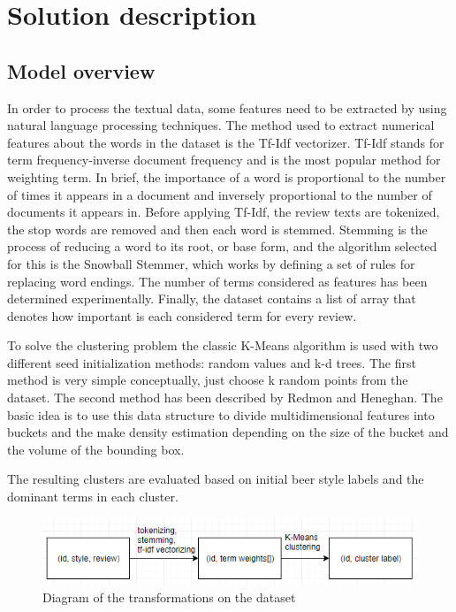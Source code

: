 \documentclass[12pt]{article}
\begin{document}
	\section{Solution description}
	\subsection{Model overview}
	In order to process the textual data, some features need to be extracted by using natural language processing techniques. The method used to extract numerical features about the words in the dataset is the Tf-Idf vectorizer. Tf-Idf\cite{TfIdfBook} stands for term frequency-inverse document frequency and is the most popular method for weighting term. In brief, the importance of a word is proportional to the number of times it appears in a document and inversely proportional to the number of documents it appears in. Before applying Tf-Idf, the review texts are tokenized, the stop words are removed and then each word is stemmed. Stemming is the process of reducing a word to its root, or base form, and the algorithm selected for this is the Snowball Stemmer\cite{SnowballStemmer}, which works by defining a set of rules for replacing word endings. The number of terms considered as features has been determined experimentally. Finally, the dataset contains a list of array that denotes how important is each considered term for every review.
	
	To solve the clustering problem the classic K-Means algorithm is used with two different seed initialization methods: random values and k-d trees. The first method is very simple conceptually, just choose k random points from the dataset. The second method has been described by Redmon and Heneghan\cite{KdTreeKmeans}. The basic idea is to use this data structure to divide multidimensional features into buckets and the make density estimation depending on the size of the bucket and the volume of the bounding box.
	
	The resulting clusters are evaluated based on initial beer style labels and the dominant terms in each cluster.
	
	\begin{figure}[H]
		\includegraphics[width=\linewidth]{resources/model.png}
		\caption{Diagram of the transformations on the dataset}
		\label{fig:modelOverview}
	\end{figure}
\end{document}
